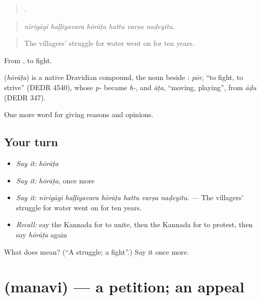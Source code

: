 \begin{quote}
     .
\end{quote}

\begin{quote}
\emph{nīrigāgi haḷḷiyavara hōrāṭa hattu varṣa naḍeyitu.}
\end{quote}

\begin{quote}
The villagers' struggle for water went on for ten years.
\end{quote}

From , to fight.

\begin{cousinweb}
\textbf{} (\emph{hōrāṭa}) is a native Dravidian compound, the noun beside : \emph{pōr}, \textquotedblleft{}to fight, to strive\textquotedblright{} (DEDR 4540), whose \emph{p-} became \emph{h-}, and \emph{āṭa}, \textquotedblleft{}moving, playing\textquotedblright{}, from \emph{āḍu} (DEDR 347).
\end{cousinweb}

\begin{grammarlens}[title={What you've built}]
One more word for giving reasons and opinions.
\end{grammarlens}

\subsection*{Your turn}
\begin{itemize}
\raggedright
  \item \emph{Say it:} \emph{hōrāṭa}
  \item \emph{Say it:} \emph{hōrāṭa}, once more
  \item \emph{Say it:} \emph{nīrigāgi haḷḷiyavara hōrāṭa hattu varṣa naḍeyitu.} — The villagers' struggle for water went on for ten years.
  \item \emph{Recall:} say the Kannada for to unite, then the Kannada for to protest, then say \emph{hōrāṭa} again
\end{itemize}

\begin{tcolorbox}[breakable,colback=teal!4,colframe=teal!35!black,title={Before you move on}]
What does  mean? (\textquotedblleft{}A struggle; a fight\textquotedblright{}.) Say it once more.
\end{tcolorbox}
\section[\texorpdfstring{\kn{ಮನವಿ} (manavi)}{ಮನವಿ (manavi)}]{ (manavi) — a petition; an appeal}

